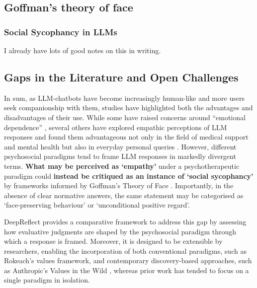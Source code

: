 
\subsection{Goffman's theory of face}
\textcolor{black!30}{\lipsum[9-10]}
\subsubsection{Social Sycophancy in LLMs}
\textcolor{black!30}{I already have lots of good notes on this in writing.}
\textcolor{black!30}{\lipsum[12-14]}

\subsection{Gaps in the Literature and Open Challenges}\label{sec:gaps}
In sum, as LLM-chatbots have become increasingly human-like and more users seek companionship with them, studies have highlighted both the advantages and disadvantages of their use. While some have raised concerns around “emotional dependence” \cite{fang-etal-psychoeffects}, several others have explored empathic perceptions of LLM responses and found them advantageous not only in the field of medical support and mental health but also in everyday personal queries \cite{Lee-etal-Empathic, sorin-etal-empathy}.
However, different psychosocial paradigms tend to frame LLM responses in markedly divergent terms. \textbf{What may be perceived as ‘empathy’} under a psychotherapeutic paradigm could \textbf{instead be critiqued as an instance of ‘social sycophancy’} by frameworks informed by Goffman's Theory of Face \cite{cheng-etal-sycophancy}.
Importantly, in the absence of clear normative answers, the same statement may be categorised as ‘face-preserving behaviour’ or ‘unconditional positive regard’. 


DeepReflect provides a comparative framework to address this gap by assessing how evaluative judgments are shaped by the psychosocial paradigm through which a response is framed. 
Moreover, it is designed to be extensible by researchers, enabling the incorporation of both conventional paradigms, such as Rokeach’s values framework, and contemporary discovery-based approaches, such as Anthropic’s Values in the Wild \cite{values-in-wild}, whereas prior work has tended to focus on a single paradigm in isolation.

